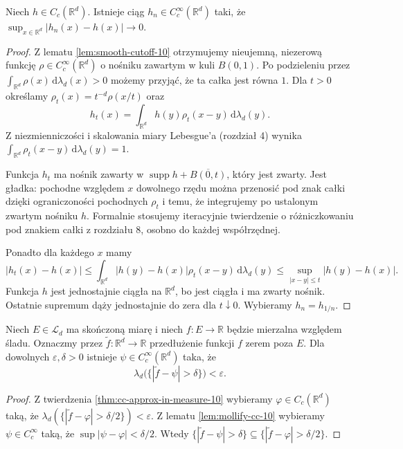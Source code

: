 \begin{lemat}
\label{lem:mollify-cc-10}
Niech $h\in C_c(\mathbb R^d)$. Istnieje ciąg
$h_n\in C_c^\infty(\mathbb R^d)$ taki, że
$\sup_{x\in\mathbb R^d}|h_n(x)-h(x)|\to0$.
\end{lemat}
\begin{proof}
Z lematu \ref{lem:smooth-cutoff-10} otrzymujemy
nieujemną, niezerową funkcję
$\rho\in C_c^\infty(\mathbb R^d)$ o nośniku
zawartym w kuli $B(0,1)$. Po podzieleniu przez
$\int_{\mathbb R^d}\rho(x)\,\mathrm d\lambda_d(x)>0$
możemy przyjąć, że ta całka jest równa $1$.
Dla $t>0$ określamy
$\rho_t(x)=t^{-d}\rho(x/t)$ oraz
\[
h_t(x)=\int_{\mathbb R^d}
 h(y)\rho_t(x-y)\,\mathrm d\lambda_d(y).
\]
Z niezmienniczości i skalowania miary Lebesgue'a
(rozdział 4) wynika
$\int_{\mathbb R^d}\rho_t(x-y)\,\mathrm d\lambda_d(y)=1$.

Funkcja $h_t$ ma nośnik zawarty w
$\operatorname{supp}h+\overline{B(0,t)}$,
który jest zwarty. Jest gładka: pochodne względem
$x$ dowolnego rzędu można przenosić pod znak
całki dzięki ograniczoności pochodnych $\rho_t$
i temu, że integrujemy po ustalonym zwartym
nośniku $h$. Formalnie stosujemy iteracyjnie
twierdzenie o różniczkowaniu pod znakiem całki
z rozdziału 8, osobno do każdej współrzędnej.

Ponadto dla każdego $x$ mamy
\[
|h_t(x)-h(x)|
\le\int_{\mathbb R^d}|h(y)-h(x)|\rho_t(x-y)
\,\mathrm d\lambda_d(y)
\le\sup_{|x-y|\le t}|h(y)-h(x)|.
\]
Funkcja $h$ jest jednostajnie ciągła na
$\mathbb R^d$, bo jest ciągła i ma zwarty nośnik.
Ostatnie supremum dąży jednostajnie do zera dla
$t\downarrow0$. Wybieramy $h_n=h_{1/n}$.
\end{proof}

\begin{wniosek}
\label{cor:smooth-approx-in-measure-10}
Niech $E\in\mathcal L_d$ ma skończoną miarę
i niech $f:E\to\mathbb R$ będzie mierzalna
względem śladu. Oznaczmy przez
$\widetilde f:\mathbb R^d\to\mathbb R$
przedłużenie funkcji $f$ zerem poza $E$.
Dla dowolnych $\varepsilon,\delta>0$ istnieje
$\psi\in C_c^\infty(\mathbb R^d)$ taka, że
\[
\lambda_d\bigl(\{|\widetilde f-\psi|>\delta\}\bigr)
<\varepsilon.
\]
\end{wniosek}
\begin{proof}
Z twierdzenia \ref{thm:cc-approx-in-measure-10}
wybieramy $\varphi\in C_c(\mathbb R^d)$ taką,
że $\lambda_d(\{|\widetilde f-\varphi|>
\delta/2\})<\varepsilon$.
Z lematu \ref{lem:mollify-cc-10} wybieramy
$\psi\in C_c^\infty$ taką, że
$\sup|\psi-\varphi|<\delta/2$.
Wtedy
$\{|\widetilde f-\psi|>\delta\}\subseteq
\{|\widetilde f-\varphi|>\delta/2\}$.
\end{proof}

